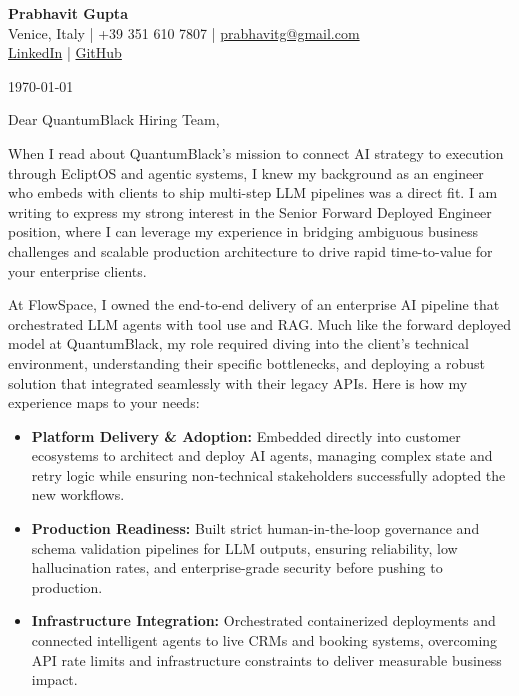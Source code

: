 \documentclass[11pt,a4paper]{article}
\begin{document}
\pagestyle{empty}

\begin{center}
    {\huge \textbf{Prabhavit Gupta}} \\[0.5em]
    Venice, Italy | +39 351 610 7807 | \href{mailto:prabhavitg@gmail.com}{prabhavitg@gmail.com} \\
    \href{https://www.linkedin.com/in/prabhavit/}{LinkedIn} | \href{https://github.com/prab-gupta}{GitHub}
\end{center}

\vspace{2em}

\today

\vspace{1em}

Dear QuantumBlack Hiring Team,

\vspace{1em}

When I read about QuantumBlack's mission to connect AI strategy to execution through EcliptOS and agentic systems, I knew my background as an engineer who embeds with clients to ship multi-step LLM pipelines was a direct fit. I am writing to express my strong interest in the Senior Forward Deployed Engineer position, where I can leverage my experience in bridging ambiguous business challenges and scalable production architecture to drive rapid time-to-value for your enterprise clients.

At FlowSpace, I owned the end-to-end delivery of an enterprise AI pipeline that orchestrated LLM agents with tool use and RAG. Much like the forward deployed model at QuantumBlack, my role required diving into the client's technical environment, understanding their specific bottlenecks, and deploying a robust solution that integrated seamlessly with their legacy APIs. Here is how my experience maps to your needs:

\begin{itemize}
    \item \textbf{Platform Delivery \& Adoption:} Embedded directly into customer ecosystems to architect and deploy AI agents, managing complex state and retry logic while ensuring non-technical stakeholders successfully adopted the new workflows.
    \item \textbf{Production Readiness:} Built strict human-in-the-loop governance and schema validation pipelines for LLM outputs, ensuring reliability, low hallucination rates, and enterprise-grade security before pushing to production.
    \item \textbf{Infrastructure Integration:} Orchestrated containerized deployments and connected intelligent agents to live CRMs and booking systems, overcoming API rate limits and infrastructure constraints to deliver measurable business impact.
\end{itemize}
\end{document}

